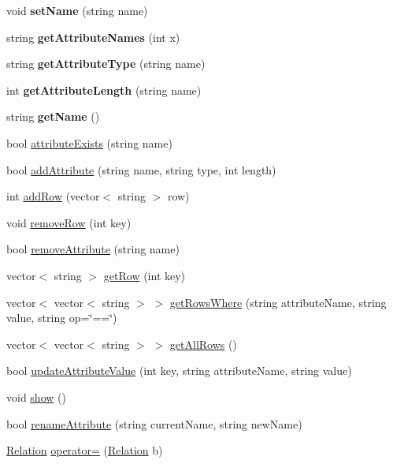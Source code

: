 \begin{DoxyCompactItemize}
\item 
\hypertarget{class_relation_aa9b3f638b86037d6806874828eaf6def}{void {\bfseries set\-Name} (string name)}\label{class_relation_aa9b3f638b86037d6806874828eaf6def}

\item 
\hypertarget{class_relation_a5436e4f87b09692326f144ee77565d47}{string {\bfseries get\-Attribute\-Names} (int x)}\label{class_relation_a5436e4f87b09692326f144ee77565d47}

\item 
\hypertarget{class_relation_a546eb99e970baa0877ad4b963942c956}{string {\bfseries get\-Attribute\-Type} (string name)}\label{class_relation_a546eb99e970baa0877ad4b963942c956}

\item 
\hypertarget{class_relation_af2648ce451bc18a893ab396dcc95a793}{int {\bfseries get\-Attribute\-Length} (string name)}\label{class_relation_af2648ce451bc18a893ab396dcc95a793}

\item 
\hypertarget{class_relation_ace3fe9536b1a3e1aac8e7c034638e585}{string {\bfseries get\-Name} ()}\label{class_relation_ace3fe9536b1a3e1aac8e7c034638e585}

\item 
bool \hyperlink{class_relation_a95c3faa21d7bc2eb8a78991dfc059f8c}{attribute\-Exists} (string name)
\item 
bool \hyperlink{class_relation_af4a5da7f3ffe0883b9e253c982cb9d20}{add\-Attribute} (string name, string type, int length)
\item 
int \hyperlink{class_relation_ac863fb3605fac72c0c2a2b9183ae282e}{add\-Row} (vector$<$ string $>$ row)
\item 
void \hyperlink{class_relation_ab8013e49e0d20e1eaab08abe8534f815}{remove\-Row} (int key)
\item 
bool \hyperlink{class_relation_ac2c0d40f65dd8a7f2dd95726afcc3091}{remove\-Attribute} (string name)
\item 
vector$<$ string $>$ \hyperlink{class_relation_a549eddb9c701414f87ea739407c1d56f}{get\-Row} (int key)
\item 
vector$<$ vector$<$ string $>$ $>$ \hyperlink{class_relation_a822ee3b07846702f74e026d4e8593115}{get\-Rows\-Where} (string attribute\-Name, string value, string op=\char`\"{}==\char`\"{})
\item 
vector$<$ vector$<$ string $>$ $>$ \hyperlink{class_relation_ae84c1daafc74ca37b516f1c7814569f8}{get\-All\-Rows} ()
\item 
bool \hyperlink{class_relation_a1a90eddb0ff2c2ec96df70dcbeb2863b}{update\-Attribute\-Value} (int key, string attribute\-Name, string value)
\item 
void \hyperlink{class_relation_a6ae6ba829869995ed0c334e6c4449329}{show} ()
\item 
bool \hyperlink{class_relation_afe7d8ff14a51b47fd8dc4e1a1a069e56}{rename\-Attribute} (string current\-Name, string new\-Name)
\item 
\hyperlink{class_relation}{Relation} \hyperlink{class_relation_a7a5fd377ae34b659a0b388a67e0b41d4}{operator=} (\hyperlink{class_relation}{Relation} b)
\end{DoxyCompactItemize}
